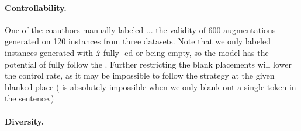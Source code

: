 \paragraph{Controllability.}
One of the coauthors manually labeled ...
the validity of 600 augmentations generated on 120 instances from three datasets.
Note that we only labeled instances generated with $\hat{x}$ fully \BLANK-ed or being empty, so the model has the potential of fully follow the \tagstrs.
Further restricting the blank placements will lower the control rate, as it may be impossible to follow the strategy at the given blanked place (\eg {} is absolutely impossible when we only blank out a single token in the sentence.)



\paragraph{Diversity.}






